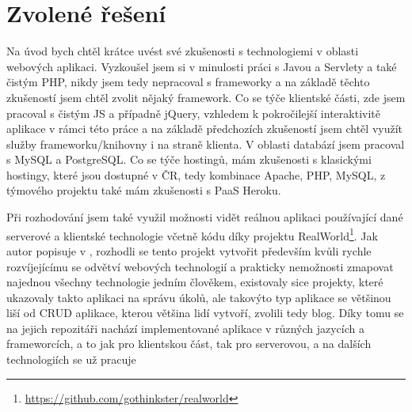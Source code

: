     \section{Zvolené řešení}\label{reseni}
    Na úvod bych chtěl krátce uvést své zkušenosti s technologiemi v oblasti webových aplikaci. Vyzkoušel jsem si v minulosti práci s Javou a Servlety a také čistým PHP, nikdy jsem tedy nepracoval s frameworky a na základě těchto zkušeností jsem chtěl zvolit nějaký framework. Co se týče klientské části, zde jsem pracoval s čistým JS a případně jQuery, vzhledem k pokročilejší interaktivitě aplikace v rámci této práce a na základě předchozích zkušeností jsem chtěl využít služby frameworku/knihovny i na straně klienta. V oblasti databází jsem pracoval s MySQL a PostgreSQL. Co se týče hostingů, mám zkušenosti s klasickými hostingy, které jsou dostupné v ČR, tedy kombinace Apache, PHP, MySQL, z týmového projektu také mám zkušenosti s PaaS Heroku.
    
    Při rozhodování jsem také využil možnosti vidět reálnou aplikaci používající dané serverové a klientské technologie včetně kódu díky projektu RealWorld\footnote{\url{https://github.com/gothinkster/realworld}}. Jak autor popisuje v \cite{realworld}, rozhodli se tento projekt vytvořit především kvůli rychle rozvíjejícímu se odvětví webových technologií a prakticky nemožnosti zmapovat najednou všechny technologie jedním člověkem, existovaly sice projekty, které ukazovaly takto aplikaci na správu úkolů, ale takovýto typ aplikace se většinou liší od CRUD aplikace, kterou většina lidí vytvoří, zvolili tedy blog. Díky tomu se na jejich repozitáři nachází implementované aplikace v různých jazycích a frameworcích, a to jak pro klientskou část, tak pro serverovou, a na dalších technologiích se už pracuje \cite{realworld-git}
    
